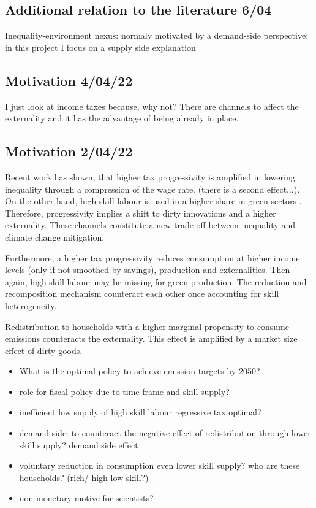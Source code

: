 

\subsection*{Additional relation to the literature 6/04}
Inequality-environment nexus: normaly motivated by a demand-side perspective; in this project I focus on a supply side explanation

\subsection*{Motivation 4/04/22}
I just look at income taxes because, why not? There are channels to affect the externality and it has the advantage of being already in place. 

\subsection*{Motivation 2/04/22}
Recent work has shown, that  higher tax progressivity is amplified in lowering inequality through a compression of the wage rate. (there is a second effect...). On the other hand, high skill labour is used in a higher share in green sectors \cite{Consoli2016DoCapital}. Therefore, progressivity implies a shift to dirty innovations and a higher externality. These channels constitute a new trade-off between inequality and climate change mitigation. 

Furthermore, a higher tax progressivity reduces consumption at higher income levels (only if not smoothed by savings), production and externalities. Then again, high skill labour may be missing for green production. The reduction and recomposition mechanism counteract each other once accounting for skill heterogeneity. 

Redistribution to households with a higher marginal propensity to consume emissions counteracts the externality. This effect is amplified by a market size effect  of dirty goods. 

\begin{itemize}
	\item What is the optimal policy to achieve emission targets by 2050?
	\item role for fiscal policy due to time frame and skill supply?
	\item inefficient low supply of high skill labour \ar regressive tax optimal?
	\item demand side: to counteract the negative effect of redistribution through lower skill supply? \ar demand side effect
	\item voluntary reduction in consumption \ar even lower skill supply? \ar who are these households? (rich/ high low skill?)
	\item non-monetary motive for scientists? 
\end{itemize}


